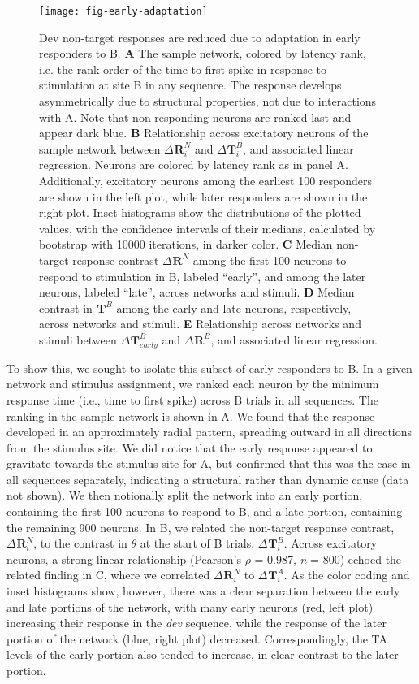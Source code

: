 \documentclass[9pt,lineno,onehalfspacing]{elife}
\newcommand{\dev}{\textit{dev}}
\newcommand{\R}[3][]{{}^{#1}_{}\boldsymbol R^{#2}_{#3}}
\newcommand{\T}[3][]{{}^{#1}_{}\boldsymbol T^{#2}_{#3}}
\begin{document}
\begin{figure}
    \texttt{[image: fig-early-adaptation]}
    \caption{%
        Dev non-target responses are reduced due to adaptation in early responders to B.
        \textbf{A} The sample network, colored by latency rank, i.e. the rank order of the time to first spike in response to stimulation at site B in any sequence. The response develops asymmetrically due to structural properties, not due to interactions with A. Note that non-responding neurons are ranked last and appear dark blue.
        \textbf{B} Relationship across excitatory neurons of the sample network between $\Delta \R{N}{i}$ and $\Delta \T{B}{i}$, and associated linear regression. Neurons are colored by latency rank as in panel A. Additionally, excitatory neurons among the earliest 100 responders are shown in the left plot, while later responders are shown in the right plot. Inset histograms show the distributions of the plotted values, with the confidence intervals of their medians, calculated by bootstrap with 10000 iterations, in darker color.
        \textbf{C} Median non-target response contrast $\Delta \R{N}{}$ among the first 100 neurons to respond to stimulation in B, labeled ``early'', and among the later neurons, labeled ``late'', across networks and stimuli.
        \textbf{D} Median contrast in $\T{B}{}$ among the early and late neurons, respectively, across networks and stimuli.
        \textbf{E} Relationship across networks and stimuli between $\Delta \T{B}{early}$ and $\Delta \R{B}{}$, and associated linear regression.
    }
    \label{fig:early-adaptation}
\end{figure}

To show this, we sought to isolate this subset of early responders to B. In a given network and stimulus assignment, we ranked each neuron by the minimum response time (i.e., time to first spike) across B trials in all sequences. The ranking in the sample network is shown in A. We found that the response developed in an approximately radial pattern, spreading outward in all directions from the stimulus site. We did notice that the early response appeared to gravitate towards the stimulus site for A, but confirmed that this was the case in all sequences separately, indicating a structural rather than dynamic cause (data not shown). We then notionally split the network into an early portion, containing the first 100 neurons to respond to B, and a late portion, containing the remaining 900 neurons. In B, we related the non-target response contrast, $\Delta \R{N}{i}$, to the contrast in $\theta$ at the start of B trials, $\Delta \T{B}{i}$. Across excitatory neurons, a strong linear relationship (Pearson's $\rho$ = 0.987, \textit{n} = 800) echoed the related finding in C, where we correlated $\Delta \R{N}{i}$ to $\Delta \T{A}{i}$. As the color coding and inset histograms show, however, there was a clear separation between the early and late portions of the network, with many early neurons (red, left plot) increasing their response in the \dev{} sequence, while the response of the later portion of the network (blue, right plot) decreased. Correspondingly, the TA levels of the early portion also tended to increase, in clear contrast to the later portion.
\end{document}
